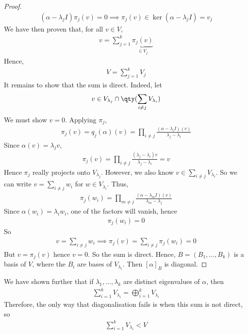 \begin{proof}
\begin{align*}
		(\alpha - \lambda_j I) \pi_j(v) = 0 \implies \pi_j(v) \in \ker(\alpha - \lambda_j I) = v_j
	\end{align*}
	We have then proven that, for all $v \in V$,
	\begin{align*}
		v = \sum_{j=1}^k \underbrace{\pi_j(v)}_{\in V_j}
	\end{align*}
	Hence,
	\begin{align*}
		V = \sum_{j=1}^k V_j
	\end{align*}
	It remains to show that the sum is direct.
	Indeed, let
	\begin{align*}
		v \in V_{\lambda_j} \cap \qty(\sum_{i \neq j} V_{\lambda_i})
	\end{align*}
	We must show $v = 0$.
	Applying $\pi_j$,
	\begin{align*}
		\pi_j(v) = q_j(\alpha)(v) = \prod_{i \neq j} \frac{(\alpha - \lambda_i I)(v)}{\lambda_j - \lambda_i}
	\end{align*}
	Since $\alpha(v) = \lambda_j v$,
	\begin{align*}
		\pi_j(v) = \prod_{i \neq j} \frac{(\lambda_j - \lambda_i)v}{\lambda_j - \lambda_i} = v
	\end{align*}
	Hence $\pi_j$ really projects onto $V_{\lambda_j}$.
	However, we also know $v \in \sum_{i \neq j} V_{\lambda_i}$.
	So we can write $v = \sum_{i \neq j} w_i$ for $w \in V_{\lambda_i}$.
	Thus,
	\begin{align*}
		\pi_j(w_i) = \prod_{m \neq j} \frac{(\alpha - \lambda_m I)(v)}{\lambda_m - \lambda_j}
	\end{align*}
	Since $\alpha(w_i) = \lambda_i w_i$, one of the factors will vanish, hence
	\begin{align*}
		\pi_j(w_i) = 0
	\end{align*}
	So
	\begin{align*}
		v = \sum_{i \neq j} w_i \implies \pi_j(v) = \sum_{i \neq j} \pi_j(w_i) = 0
	\end{align*}
	But $v = \pi_j(v)$ hence $v = 0$.
	So the sum is direct.
	Hence, $B = (B_1, \dots, B_k)$ is a basis of $V$, where the $B_i$ are bases of $V_{\lambda_i}$.
	Then $[\alpha]_B$ is diagonal.
\end{proof}
\begin{remark}
	We have shown further that if $\lambda_1, \dots, \lambda_k$ are distinct eigenvalues of $\alpha$, then
	\begin{align*}
		\sum_{i=1}^k V_{\lambda_i} = \bigoplus_{i=1}^k V_{\lambda_i}
	\end{align*}
	Therefore, the only way that diagonalisation fails is when this sum is not direct, so
	\begin{align*}
		\sum_{i=1}^k V_{\lambda_i} < V
	\end{align*}
\end{remark}
